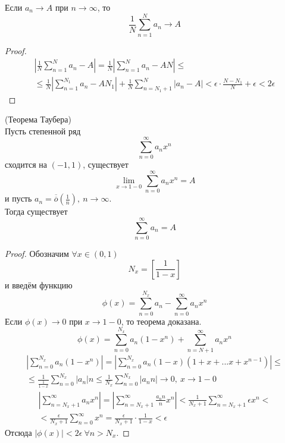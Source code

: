 \begin{lemma}
    Если $a_n \rightarrow A$ при $n \rightarrow \infty$, то
    \[\frac{1}{N}\sum_{n=1}^{N}a_n \rightarrow A\]
\end{lemma}
\begin{proof}
    \begin{multline*}
        \left|\frac{1}{N}\sum_{n=1}^{N}a_n - A\right| = \frac{1}{N}\left|\sum\limits_{n=1}^{N}a_n - AN\right|\leq \\
        \leq \frac{1}{N}\left|\sum\limits_{n=1}^{N_1}a_n - AN_1\right|+\frac{1}{N}\sum\limits_{n=N_1+1}^{N}|a_n - A| < \epsilon\cdot \frac{N-N_1}{N} + \epsilon < 2\epsilon
    \end{multline*}
\end{proof}
\begin{theorem}(Теорема Таубера)\\
    Пусть степенной ряд
    \[\sum_{n=0}^{\infty}a_n x^n\]
    сходится на $(-1, 1)$, существует
    \[\lim \limits_{x\rightarrow 1-0} \sum_{n=0}^{\infty}a_n x^n = A\]
    и пусть $a_n = \overline{\overline{o}}(\frac{1}{n}),\ n \to \infty$.\\
    Тогда существует
    \[\sum_{n=0}^{\infty}a_n = A\]
\end{theorem}
\begin{proof}
    Обозначим $\forall x \in (0, 1)$
    \[N_x = \left[\frac{1}{1-x}\right]\]
    и введём функцию
    \[\phi(x) = \sum_{n=0}^{N_x}a_n - \sum_{n=0}^{\infty}a_n x^n\]
    Если $\phi(x) \rightarrow 0$ при $x \rightarrow 1-0$, то теорема доказана.
    \[\phi(x) = \sum_{n=0}^{N_x}a_n(1-x^n) + \sum_{n=N+1}^{\infty}a_n x^n\]
    \begin{multline*}
        \left|\sum_{n=0}^{N_x}a_n(1-x^n)\right| = \left|\sum_{n=0}^{N_x}a_n(1-x)(1+x+...x+x^{n-1})\right| \leq \\
        \leq \frac{1}{\frac{1}{1-x}}\sum_{n=0}^{N_x}|a_n|n \leq \frac{1}{N_x}\sum_{n=0}^{N_x}|a_nn| \rightarrow 0,\ x \rightarrow 1-0
    \end{multline*}
    \begin{multline*}
        \left|\sum_{n=N_x+1}^{\infty}a_n x^n\right| = \left|\sum_{n=N_x+1}^{\infty}\frac{a_n n}{n} x^n \right| < \frac{1}{N_x + 1}\sum_{n=N_x+1}^{\infty}\epsilon x^n <\\
        <\frac{\epsilon}{N_x + 1}\sum_{n=0}^{\infty}x^n = \frac{\epsilon}{N_x + 1} \cdot \frac{1}{1-x} < \epsilon
    \end{multline*}
    Отсюда $|\phi(x)| < 2\epsilon \ \forall n > N_x$.
\end{proof}

